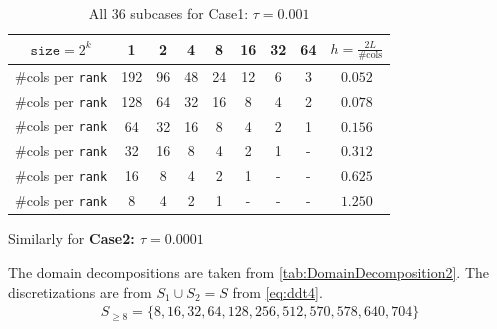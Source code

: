 \begin{table}[H]
    \centering
    \begin{tabular}{|c|c|c|c|c|c|c|c|c|}
        \hline
        $\texttt{size}=2^k$ & 1 & 2 & 4 & 8 & 16 & 32 & 64 & $h = \frac{2L}{\text{\#cols}}$\\
        \hline
        \#cols per \texttt{rank} & 192 & 96 & 48 & 24 & 12 & 6 & 3 & $ 0.052$\\
        \hline
        \#cols per \texttt{rank} & 128 & 64 & 32 & 16 & 8 & 4 & 2 & $0.078$\\
        \hline
        \#cols per \texttt{rank} & 64 & 32 & 16 & 8 & 4 & 2 & 1 & $0.156$ \\
        \hline
        \#cols per \texttt{rank} & 32 & 16 & 8 & 4 & 2 & 1  & - & $0.312$\\
        \hline
        \#cols per \texttt{rank} & 16 & 8 & 4 & 2 & 1  & - & - & $0.625$\\
        \hline
        \#cols per \texttt{rank} & 8 & 4 & 2 & 1 & -  & - & - & $1.250$\\
        \hline
    \end{tabular}
    \caption{All 36 subcases for Case1: $\tau=0.001$}
\end{table}

Similarly for \textbf{Case2: $\tau=0.0001$}

The domain decompositions are taken from \autoref{tab:DomainDecomposition2}. The discretizations are from $S_1 \cup S_2 = S$ from \autoref{eq:ddt4}.
\begin{equation}
    \begin{aligned}
        S_{\geq8} = \{8,16,32,64,128,256,512,570,578,640,704\}
    \end{aligned}
\end{equation}


